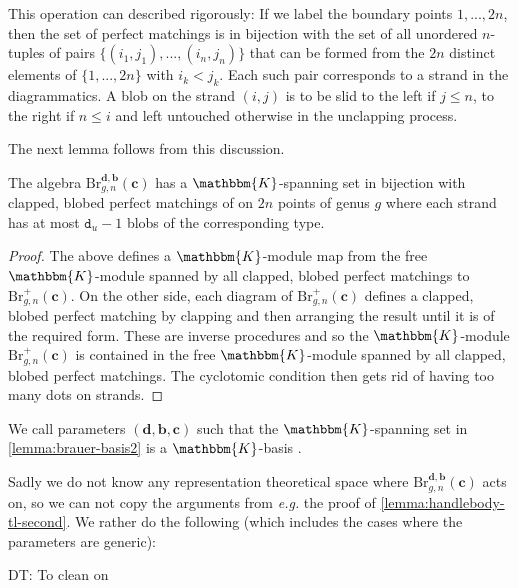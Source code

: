 \documentclass[a4paper,11pt]{amsart}
\let\emph\relax
\newcommand{\eg}{\textsl{e.g.}}
\renewcommand{\dots}{\text{...}}
\newcommand{\setstuff}[1]{\mathrm{#1}}
\newcommand{\KK}{\mathbbm{K}}
\newcommand{\bsym}[1]{\boldsymbol{#1}}
\newcommand{\varsym}[1]{\mathtt{#1}}
\newcommand{\cpar}{\bsym{c}}
\newcommand{\bpar}{\bsym{b}}
\newcommand{\dpar}{\bsym{d}}
\newcommand{\dvar}{\varsym{d}}
\def\DT#1{\textcolor[rgb]{1.00,0.00,1.00}{DT: #1}}
\numberwithin{equation}{section}
\let\fullref\autoref
\begin{document}
This operation can described rigorously: 
If we label the boundary 
points $1,\dots,2n$, then  
the set of perfect matchings is in 
bijection with the set of all 
unordered $n$-tuples of pairs 
$\{(i_{1},j_{1}),\dots,(i_{n},j_{n})\}$ that can be formed from the $2n$ 
distinct elements of $\{1,\dots,2n\}$ with $i_{k}<j_{k}$. Each such pair corresponds to a strand in the diagrammatics. 
A blob on the strand $(i,j)$ is to be slid to the 
left if $j\leq n$, to the right if $n\leq i$ 
and left untouched otherwise in the unclapping process.

The next lemma follows from this discussion.

\begin{lemma}\label{lemma:brauer-basis2}
The algebra 
$\setstuff{Br}_{g,n}^{\dpar,\bpar}(\cpar)$ 
has a $\KK$-spanning set in bijection with clapped, blobed 
perfect matchings of 
on $2n$ points of genus  
$g$ where each strand has at 
most $\dvar_{u}-1$ blobs of the corresponding type.
\end{lemma}

\begin{proof}
The above defines a $\KK$-module map from 
the free $\KK$-module spanned by all 
clapped, blobed perfect matchings to 
$\setstuff{Br}^{+}_{g,n}(\cpar)$.	
On the other side, each diagram of 
$\setstuff{Br}^{+}_{g,n}(\cpar)$ defines a 
clapped, blobed perfect 
matching by clapping and then arranging the result until it is of the required form.
These are inverse 
procedures and so the $\KK$-module 
$\setstuff{Br}^{+}_{g,n}(\cpar)$ 
is contained in the free 
$\KK$-module spanned by all 
clapped, blobed perfect matchings.
The cyclotomic condition then gets rid of 
having too many dots on strands.
\end{proof}

\begin{definition}\label{def:bmw-admissible}
We call parameters $(\dpar,\bpar,\cpar)$ such that the $\KK$-spanning set 
in \fullref{lemma:brauer-basis2} is a $\KK$-basis \emph{admissible}.
\end{definition}

Sadly we do not know any representation theoretical space 
where $\setstuff{Br}_{g,n}^{\dpar,\bpar}(\cpar)$ acts on, 
so we can not copy the arguments from {\eg} the proof of \fullref{lemma:handlebody-tl-second}. We rather do the following 
(which includes the cases where the parameters are generic):

\DT{To clean on}
\end{document}
